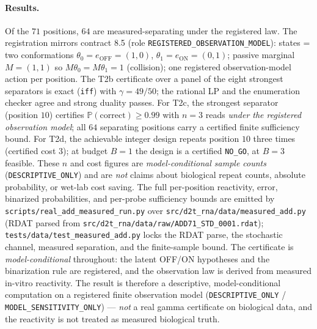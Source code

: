 \documentclass[11pt]{article}
\begin{document}
\paragraph{Results.}
Of the $71$ positions, $64$ are measured-separating under the registered law. The registration mirrors
contract 8.5 (role \texttt{REGISTERED\_OBSERVATION\_MODEL}): states = two conformations
$\theta_0=e_{\mathrm{OFF}}=(1,0)$, $\theta_1=e_{\mathrm{ON}}=(0,1)$; passive marginal $M=(1,1)$ so
$M\theta_0=M\theta_1=1$ (collision); one registered observation-model action per position. The T2b
certificate over a panel of the eight strongest separators is exact (\texttt{iff}) with $\gamma=49/50$;
the rational LP and the enumeration checker agree and strong duality passes. For T2c, the strongest
separator (position $10$) certifies $\mathbb{P}(\mathrm{correct})\ge0.99$ with $n=3$ reads
\emph{under the registered observation model}; all $64$ separating positions carry a certified finite
sufficiency bound. For T2d, the achievable integer design repeats position $10$ three times (certified
cost $3$); at budget $B=1$ the design is a certified \texttt{NO\_GO}, at $B=3$ feasible. These $n$ and
cost figures are \emph{model-conditional sample counts} (\texttt{DESCRIPTIVE\_ONLY}) and are \emph{not}
claims about biological repeat counts, absolute probability, or wet-lab cost saving. The full
per-position reactivity, error, binarized probabilities, and per-probe sufficiency bounds are emitted by
\texttt{scripts/real\_add\_measured\_run.py} over \texttt{src/d2t\_rna/data/measured\_add.py} (RDAT
parsed from \texttt{src/d2t\_rna/data/raw/ADD71\_STD\_0001.rdat}); \texttt{tests/data/test\_measured\_add.py}
locks the RDAT parse, the stochastic channel, measured separation, and the finite-sample bound.
The certificate is \emph{model-conditional} throughout: the latent OFF/ON hypotheses and the binarization
rule are registered, and the observation law is derived from measured in-vitro reactivity. The result is
therefore a descriptive, model-conditional computation on a registered finite observation model
(\texttt{DESCRIPTIVE\_ONLY} / \texttt{MODEL\_SENSITIVITY\_ONLY}) --- \emph{not} a real gamma certificate
on biological data, and the reactivity is not treated as measured biological truth.
\end{document}
